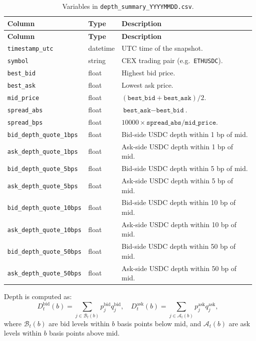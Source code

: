 \documentclass[11pt,a4paper]{article}
\begin{document}
\begin{longtable}{L{4.5cm}L{2.2cm}L{7.9cm}}
\caption{Variables in \texttt{depth\_summary\_YYYYMMDD.csv}.}\\
\toprule
\textbf{Column} & \textbf{Type} & \textbf{Description} \\
\midrule
\endfirsthead
\toprule
\textbf{Column} & \textbf{Type} & \textbf{Description} \\
\midrule
\endhead
\bottomrule
\endfoot
\texttt{timestamp\_utc} & datetime & UTC time of the snapshot. \\
\texttt{symbol} & string & CEX trading pair (e.g.\ \texttt{ETHUSDC}). \\
\texttt{best\_bid} & float & Highest bid price. \\
\texttt{best\_ask} & float & Lowest ask price. \\
\texttt{mid\_price} & float & $(\texttt{best\_bid}+\texttt{best\_ask})/2$. \\
\texttt{spread\_abs} & float & $\texttt{best\_ask}-\texttt{best\_bid}$. \\
\texttt{spread\_bps} & float & $10000 \times \texttt{spread\_abs}/\texttt{mid\_price}$. \\
\texttt{bid\_depth\_quote\_1bps} & float & Bid-side USDC depth within 1 bp of mid. \\
\texttt{ask\_depth\_quote\_1bps} & float & Ask-side USDC depth within 1 bp of mid. \\
\texttt{bid\_depth\_quote\_5bps} & float & Bid-side USDC depth within 5 bp of mid. \\
\texttt{ask\_depth\_quote\_5bps} & float & Ask-side USDC depth within 5 bp of mid. \\
\texttt{bid\_depth\_quote\_10bps} & float & Bid-side USDC depth within 10 bp of mid. \\
\texttt{ask\_depth\_quote\_10bps} & float & Ask-side USDC depth within 10 bp of mid. \\
\texttt{bid\_depth\_quote\_50bps} & float & Bid-side USDC depth within 50 bp of mid. \\
\texttt{ask\_depth\_quote\_50bps} & float & Ask-side USDC depth within 50 bp of mid. \\
\end{longtable}

Depth is computed as:
\[
  D^{\mathrm{bid}}_t(b) = \sum_{j \in \mathcal{B}_t(b)} p^{\mathrm{bid}}_{j} q^{\mathrm{bid}}_{j}, \quad
  D^{\mathrm{ask}}_t(b) = \sum_{j \in \mathcal{A}_t(b)} p^{\mathrm{ask}}_{j} q^{\mathrm{ask}}_{j},
\]
where $\mathcal{B}_t(b)$ are bid levels within $b$ basis points below mid, and $\mathcal{A}_t(b)$ are ask levels within $b$ basis points above mid.
\end{document}
